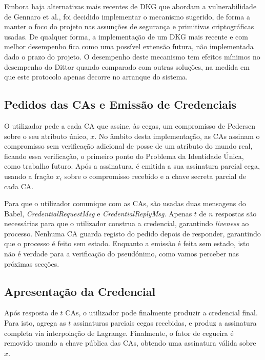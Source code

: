 Embora haja alternativas mais recentes de DKG que abordam a vulnerabilidade de Gennaro et al., foi decidido implementar o mecanismo sugerido, de forma a manter o foco do projeto nas assunções de segurança e primitivas criptográficas usadas. De qualquer forma, a implementação de um DKG mais recente e com melhor desempenho fica como uma possível extensão futura, não implementada dado o prazo do projeto. O desempenho deste mecanismo tem efeitos mínimos no desempenho do Dittor quando comparado com outras soluções, na medida em que este protocolo apenas decorre no arranque do sistema.

\subsection{Pedidos das CAs e Emissão de Credenciais}
\label{sub:dittor_protocolo_pedidos_cas}

O utilizador pede a cada CA que assine, às cegas, um compromisso de Pedersen sobre o seu atributo único, $x$. No âmbito desta implementação, as CAs assinam o compromisso sem verificação adicional de posse de um atributo do mundo real, ficando essa verificação, o primeiro ponto do Problema da Identidade Única, como trabalho futuro. Após a assinatura, é emitida a sua assinatura parcial cega, usando a fração $x_i$ sobre o compromisso recebido e a chave secreta parcial de cada CA.

Para que o utilizador comunique com as CAs, são usadas duas mensagens do Babel, \textit{CredentialRequestMsg} e \textit{CredentialReplyMsg}. Apenas $t$ de $n$ respostas são necessárias para que o utilizador construa a credencial, garantindo \textit{liveness} ao processo. Nenhuma CA guarda registo do pedido depois de responder, garantindo que o processo é feito sem estado. Enquanto a emissão é feita sem estado, isto não é verdade para a verificação do pseudónimo, como vamos perceber nas próximas secções.

\subsection{Apresentação da Credencial}
\label{sub:dittor_protocolo_apresentacao_credencial}

Após resposta de $t$ CAs, o utilizador pode finalmente produzir a credencial final. Para isto, agrega as $t$ assinaturas parciais cegas recebidas, e produz a assinatura completa via interpolação de Lagrange. Finalmente, o fator de cegueira é removido usando a chave pública das CAs, obtendo uma assinatura válida sobre $x$.

